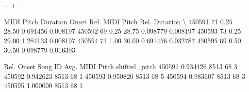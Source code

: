 \documentclass[letterpaper,10pt,english]{sphinxmanual}
\newlength\nbsphinxcodecellspacing
\begin{document}
{

\kern-\sphinxverbatimsmallskipamount\kern-\baselineskip
\kern+\FrameHeightAdjust\kern-\fboxrule
\vspace{\nbsphinxcodecellspacing}

\begin{sphinxVerbatim}[commandchars=\\\{\}]
\llap{\color{nbsphinxout}[59]:\,\hspace{\fboxrule}\hspace{\fboxsep}}        MIDI Pitch  Duration  Onset  Rel. MIDI Pitch  Rel. Duration  \textbackslash{}
450591          71      0.25  28.50         0.691456       0.008197
450592          69      0.25  28.75         0.098779       0.008197
450593          73      0.25  29.00         1.284133       0.008197
450594          71      1.00  30.00         0.691456       0.032787
450595          69      0.50  30.50         0.098779       0.016393

        Rel. Onset  Song ID  Avg. MIDI Pitch  shifted\_pitch
450591    0.934426     8513               68              3
450592    0.942623     8513               68              1
450593    0.950820     8513               68              5
450594    0.983607     8513               68              3
450595    1.000000     8513               68              1
\end{sphinxVerbatim}
}

{
\begin{sphinxVerbatim}[commandchars=\\\{\}]
\llap{\color{nbsphinxin}[60]:\,\hspace{\fboxrule}\hspace{\fboxsep}}  \PYG{p}{[}\PYG{p}{]} \PYG{p}{[}\PYG{p}{]}  
\end{sphinxVerbatim}
}
\end{document}

